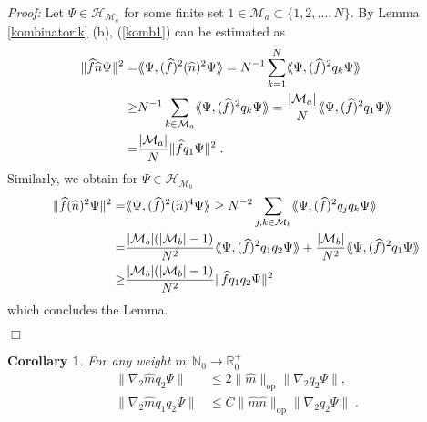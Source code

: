 \documentclass[11pt, english, american]{article}
\newcommand{\laa}{\langle\hspace{-0.08cm}\langle}
\newcommand{\raa}{\rangle\hspace{-0.08cm}\rangle}
\newtheorem{corollary}[theorem]  {Corollary}
\newenvironment{proof}{\emph{Proof:}}{\begin{flushright} $ \Box $ \end{flushright}}
\begin{document}
\begin{proof}
Let $\Psi\in\mathcal{H}_{\mathcal{M}_a}$ for some finite set $1\in\mathcal{M}_a\subset\{1,2,\ldots,N\}$.
By Lemma \ref{kombinatorik} (b),  (\ref{komb1}) can be estimated as
\begin{align*}\|\widehat{f}\widehat{n}\Psi\|^2
=&\laa\Psi,(\widehat{f})^{2}(\widehat{n})^2\Psi\raa
%
=N^{-1}\sum_{k=1}^N\laa\Psi,(\widehat{f})^{2}q_k\Psi\raa
%
\\\geq&  N^{-1}\sum_{k\in\mathcal{M}_a}\laa\Psi,(\widehat{f})^{2}q_k\Psi\raa
%
=\frac{|\mathcal{M}_a|}{N}\laa\Psi,(\widehat{f})^{2}q_1\Psi\raa
%
\\=&\frac{|\mathcal{M}_a|}{N}\|\widehat{f}
q_1\Psi\|^2\;.
 \end{align*}
Similarly, we obtain for $\Psi\in\mathcal{H}_{\mathcal M_b}$
 \begin{align*} \|\widehat{f}
(\widehat{n})^2\Psi\|^2 =&\laa\Psi,(\widehat{f}
)^2(\widehat{n})^4\Psi\raa
%
\geq N^{-2}\sum_{j,k\in\mathcal{M}_b}\laa\Psi,(\widehat{f} )^2q_j
q_k\Psi\raa
%
\\=&\frac{|\mathcal{M}_b|(|\mathcal{M}_b|-1)}{N^2}\laa\Psi,(\widehat{f} )^2q_1
q_2\Psi\raa+\frac{|\mathcal{M}_b|}{N^2}\laa\Psi,(\widehat{f}
)^2q_1\Psi\raa
%
\\\geq& \frac{|\mathcal{M}_b|(|\mathcal{M}_b|-1)}{N^2} \|\widehat{f} q_1q_2\Psi\|^2
 \end{align*}
which concludes the Lemma.
\end{proof}
\begin{corollary}\label{kombinatorikc}
For any weight $m:\mathbb{N}_0\to\mathbb{R}^+_0$ \begin{align}\label{coreins}
\|\nabla_2 \widehat{m}q_2\Psi\|&\leq 2\|\widehat{m}\|_{\text{op}}\|\nabla_2q_2\Psi\| ,
\\\label{corzwei}
\|\nabla_2 \widehat{m}q_1q_2\Psi\|&\leq C\|\widehat{m}\widehat{n}\|_{\text{op}}\|\nabla_2q_2\Psi\|\;.
\end{align}
\end{corollary}
\end{document}

